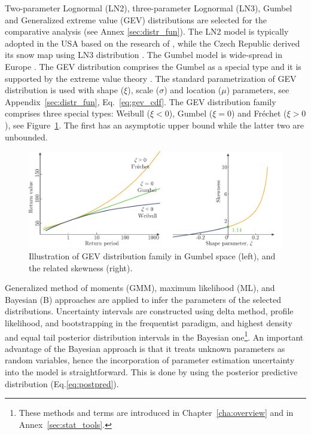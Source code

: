 Two-parameter Lognormal (LN2), three-parameter Lognormal (LN3), Gumbel and Generalized extreme value (GEV) distributions are selected for the comparative analysis (see Annex \ref{sec:distr_fun}). The LN2 model is typically adopted in the USA \citep{ASCE2010} based on the research of \citet{Ellingwood1984}, while the Czech Republic derived its snow map using LN3 distribution \citep{Krivy2010}. The Gumbel model is wide-spread in Europe \citep{Sanpaolesi1998, JCSS_load}. The GEV distribution comprises the Gumbel as a special type and it is supported by the extreme value theory \citep{Coles2001}. The standard parametrization of GEV distribution is used with shape ($\xi$), scale ($\sigma$) and location ($\mu$) parameters, see Appendix~\ref{sec:distr_fun}, Eq.~\ref{eq:gev_cdf}. The GEV distribution family comprises three special types: Weibull ($\xi < 0$), Gumbel ($\xi = 0$) and Fréchet ($\xi > 0$), see Figure~\ref{fig:gev_skewness}. The first has an asymptotic upper bound while the latter two are unbounded.

\begin{figure}[htbp!]
	\centering    
	\includegraphics[width=1\textwidth]{GEV_return_value_plot_and_skewness.pdf}
	\caption{Illustration of GEV distribution family in Gumbel space (left), and the related skewness (right).}
	\label{fig:gev_skewness}
\end{figure}

Generalized method of moments (GMM), maximum likelihood (ML), and Bayesian (B) approaches are applied to infer the parameters of the selected distributions. Uncertainty intervals are constructed using delta method, profile likelihood, and bootstrapping in the frequentist paradigm, and highest density and equal tail posterior distribution intervals in the Bayesian one\footnote{These methods and terms are introduced in Chapter~\ref{cha:overview} and in Annex~\ref{sec:stat_tools}.}. An important advantage of the Bayesian approach is that it treats unknown parameters as random variables, hence the incorporation of parameter estimation uncertainty into the model is straightforward. This is done by using the posterior predictive distribution (Eq.\ref{eq:postpred}).

